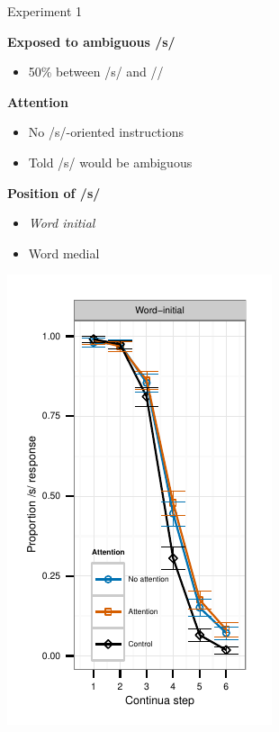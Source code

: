 \documentclass{beamer}
\begin{document}
\begin{frame}{Experiment 1}

\begin{minipage}{0.45\textwidth}
\textbf{Exposed to ambiguous /s/}
\begin{itemize}
\item 50\% between /s/ and /\textesh/
\end{itemize}

\textbf{Attention}
\begin{itemize}
\item No /s/-oriented instructions
\item Told /s/ would be ambiguous
\end{itemize}

\textbf{Position of /s/}
\begin{itemize}
\item \emph{Word initial}
\item Word medial
\end{itemize}
\end{minipage}
\hfill
\begin{minipage}{0.45\textwidth}
\includegraphics{graphs/exp1_categresults_present2-initial}
\end{minipage}

\end{frame}
\end{document}
